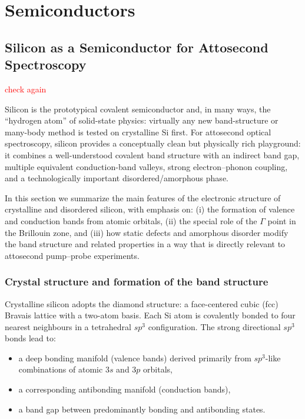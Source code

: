 \chapter{Semiconductors}
\label{chap:silicon}


\section{Silicon as a Semiconductor for Attosecond Spectroscopy}

\textcolor{red}{check again}

Silicon is the prototypical covalent semiconductor and, in many ways, the ``hydrogen atom'' of solid-state physics: virtually any new band-structure or many-body method is tested on crystalline Si first.\cite{Robertson1983,SemiconductorStructureOverview} 
For attosecond optical spectroscopy, silicon provides a conceptually clean but physically rich playground: it combines a well-understood covalent band structure with an indirect band gap, multiple equivalent conduction-band valleys, strong electron--phonon coupling, and a technologically important disordered/amorphous phase.

In this section we summarize the main features of the electronic structure of crystalline and disordered silicon, with emphasis on:
(i) the formation of valence and conduction bands from atomic orbitals,  
(ii) the special role of the $\Gamma$ point in the Brillouin zone, and  
(iii) how static defects and amorphous disorder modify the band structure and related properties in a way that is directly relevant to attosecond pump--probe experiments.

\subsection{Crystal structure and formation of the band structure}

Crystalline silicon adopts the diamond structure: a face-centered cubic (fcc) Bravais lattice with a two-atom basis. Each Si atom is covalently bonded to four nearest neighbours in a tetrahedral $sp^3$ configuration. The strong directional $sp^3$ bonds lead to:
\begin{itemize}
  \item a deep bonding manifold (valence bands) derived primarily from $sp^3$-like combinations of atomic $3s$ and $3p$ orbitals,
  \item a corresponding antibonding manifold (conduction bands),
  \item a band gap between predominantly bonding and antibonding states.\cite{Robertson1983}
\end{itemize}

